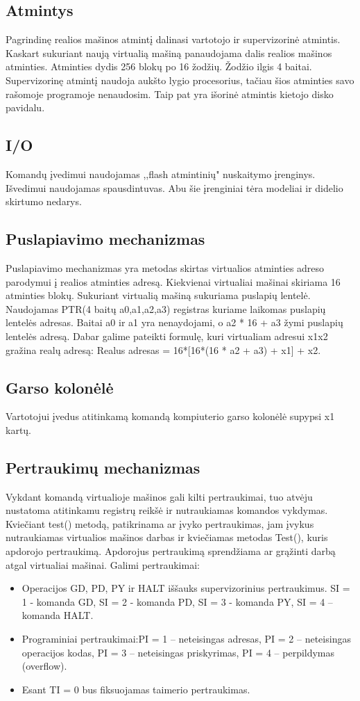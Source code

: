 \documentclass[oneside]{VUMIFPSkursinis}
\begin{document}
\subsection{Atmintys}
Pagrindinę realios mašinos atmintį dalinasi vartotojo ir supervizorinė atmintis. Kaskart sukuriant naują virtualią mašiną panaudojama dalis realios mašinos atminties. Atminties dydis 256 blokų po 16 žodžių. Žodžio ilgis 4 baitai. Supervizorinę atmintį naudoja aukšto lygio procesorius, tačiau šios atminties savo rašomoje programoje nenaudosim. Taip pat yra išorinė atmintis kietojo disko pavidalu.

\subsection{I/O}
Komandų įvedimui naudojamas ,,flash atmintinių" nuskaitymo įrenginys. Išvedimui naudojamas spausdintuvas. Abu šie įrenginiai tėra modeliai ir didelio skirtumo nedarys.

\subsection{Puslapiavimo mechanizmas}
Puslapiavimo mechanizmas yra metodas skirtas virtualios atminties adreso parodymui į realios atminties adresą. Kiekvienai virtualiai mašinai skiriama 16 atminties blokų. Sukuriant virtualią mašiną sukuriama puslapių lentelė. Naudojamas PTR(4 baitų a0,a1,a2,a3) registras kuriame laikomas puslapių lentelės adresas. Baitai a0 ir a1 yra nenaydojami, o a2 * 16 + a3 žymi puslapių lentelės adresą. Dabar galime pateikti formulę, kuri virtualiam adresui x1x2 gražina realų adresą: Realus adresas = 16*[16*(16 * a2 + a3) + x1] + x2.
\subsection{Garso kolonėlė}
Vartotojui įvedus atitinkamą komandą kompiuterio garso kolonėlė supypsi x1 kartų.
\subsection{Pertraukimų mechanizmas}
Vykdant komandą virtualioje mašinos gali kilti pertraukimai, tuo atvėju nustatoma atitinkamu registrų reikšė ir nutraukiamas komandos vykdymas. Kviečiant test() metodą, patikrinama ar įvyko pertraukimas, jam įvykus nutraukiamas virtualios mašinos darbas ir kviečiamas metodas Test(), kuris apdorojo pertraukimą. Apdorojus pertraukimą sprendžiama ar grąžinti darbą atgal virtualiai mašinai. Galimi pertraukimai:
\begin{itemize}
\item Operacijos GD, PD, PY ir HALT iššauks supervizorinius pertraukimus. SI = 1 - komanda
GD, SI = 2 - komanda PD, SI = 3 - komanda PY, SI = 4 – komanda HALT.
\item Programiniai pertraukimai:PI = 1 – neteisingas adresas, PI = 2 – neteisingas operacijos
kodas, PI = 3 – neteisingas priskyrimas, PI = 4 – perpildymas (overflow).
\item Esant TI = 0 bus fiksuojamas taimerio pertraukimas.
\end{itemize}
\end{document}
